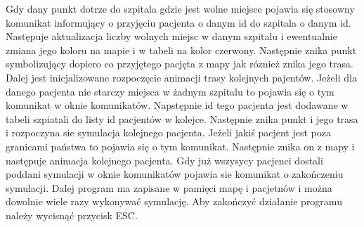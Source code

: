 \documentclass[10pt,a4paper]{article}
\begin{document}
Gdy dany punkt dotrze do szpitala gdzie jest wolne miejsce pojawia się stosowny komunikat informujący o przyjęciu pacjenta o danym id do szpitala o danym id. Następuje aktualizacja liczby wolnych miejsc w danym szpitalu i ewentualnie zmiana jego koloru na mapie i w tabeli na kolor czerwony. Następnie znika punkt symbolizujący dopiero co przyjętego pacjęta z mapy jak róznież znika jego trasa. Dalej jest inicjalizowane rozpoczęcie animacji trasy kolejnych pajentów. Jeżeli dla danego pacjenta nie starczy miejsca w żadnym szpitalu to pojawia się o tym komunikat w oknie komunikatów. Napstępnie id tego pacjenta jest dodawane w tabeli szpiatali do listy id pacjentów w kolejce. Następnie znika punkt i jego trasa i rozpoczyna sie symulacja kolejnego pacjenta. Jeżeli jakiś pacjent jest poza granicami państwa to pojawia się o tym komunikat. Następnie znika on z mapy i następuje animacja kolejnego pacjenta. Gdy już wszysycy pacjenci dostali poddani symulacji w oknie komunikatów pojawia sie komunikat o zakończeniu symulacji. Dalej program ma zapisane w pamięci mapę i pacjetnów i można dowolnie wiele razy wykonywać symulację. Aby zakończyć działanie programu należy wycisnąć przycisk ESC.
\end{document}
